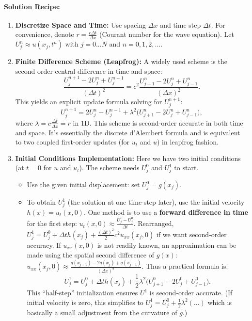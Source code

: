 \documentclass[a4paper,11pt]{report}
\begin{document}
\paragraph{Solution Recipe:}
\begin{enumerate}
    \item \textbf{Discretize Space and Time:} Use spacing $\Delta x$ and time step $\Delta t$. For convenience, denote $r = \frac{c\Delta t}{\Delta x}$ (Courant number for the wave equation). Let $U_j^n \approx u(x_j, t^n)$ with $j=0...N$ and $n=0,1,2,...$.
    \item \textbf{Finite Difference Scheme (Leapfrog):} A widely used scheme is the second-order central difference in time and space:
          $$\frac{U_j^{n+1} - 2U_j^n + U_j^{n-1}}{(\Delta t)^2} = c^2 \frac{U_{j+1}^n - 2U_j^n + U_{j-1}^n}{(\Delta x)^2}.$$
          This yields an explicit update formula solving for $U_j^{n+1}$:
          $$U_j^{n+1} = 2U_j^n - U_j^{n-1} + \lambda^2\big(U_{j+1}^n - 2U_j^n + U_{j-1}^n\big),$$
          where $\lambda = c\frac{\Delta t}{\Delta x} = r$ in 1D. This scheme is second-order accurate in both time and space. It’s essentially the discrete d’Alembert formula and is equivalent to two coupled first-order updates (for $u_t$ and $u$) in leapfrog fashion.
    \item \textbf{Initial Conditions Implementation:} Here we have two initial conditions (at $t=0$ for $u$ and $u_t$). The scheme needs $U_j^0$ and $U_j^1$ to start.
          \begin{itemize}
              \item Use the given initial displacement: set $U_j^0 = g(x_j)$.
              \item To obtain $U_j^1$ (the solution at one time-step later), use the initial velocity $h(x) = u_t(x,0)$.
                    One method is to use a \textbf{forward difference in time} for the first step: $u_t(x,0) \approx \frac{U_j^1 - U_j^0}{\Delta t}$.
                    Rearranged, $U_j^1 = U_j^0 + \Delta th(x_j) + \frac{(\Delta t)^2}{2}c^2u_{xx}(x_j, 0)$ if we want second-order accuracy. If $u_{xx}(x,0)$ is not readily known, an approximation can be made using the spatial second difference of $g(x)$: $u_{xx}(x_j,0) \approx \frac{g(x_{j+1}) - 2g(x_j) + g(x_{j-1})}{(\Delta x)^2}$.
                    Thus a practical formula is:
                    $$U_j^1 = U_j^0 + \Delta th(x_j) + \frac{1}{2}\lambda^2 \big(U_{j+1}^0 - 2U_j^0 + U_{j-1}^0\big).$$
                    This “half-step” initialization ensures $U^1$ is second-order accurate. (If initial velocity is zero, this simplifies to $U_j^1 = U_j^0 + \frac{1}{2}\lambda^2(...)$ which is basically a small adjustment from the curvature of $g$.)

\end{itemize}
\end{enumerate}
\end{document}
